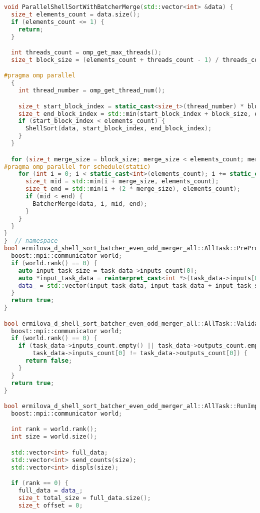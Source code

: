 \documentclass[a4paper,12pt]{article}
\begin{document}
\begin{lstlisting}[language=C++]
void ParallelShellSortWithBatcherMerge(std::vector<int> &data) {
  size_t elements_count = data.size();
  if (elements_count <= 1) {
    return;
  }

  int threads_count = omp_get_max_threads();
  size_t block_size = (elements_count + threads_count - 1) / threads_count;

#pragma omp parallel
  {
    int thread_number = omp_get_thread_num();

    size_t start_block_index = static_cast<size_t>(thread_number) * block_size;
    size_t end_block_index = std::min(start_block_index + block_size, elements_count) - 1;
    if (start_block_index < elements_count) {
      ShellSort(data, start_block_index, end_block_index);
    }
  }

  for (size_t merge_size = block_size; merge_size < elements_count; merge_size *= 2) {
#pragma omp parallel for schedule(static)
    for (int i = 0; i < static_cast<int>(elements_count); i += static_cast<int>(2 * merge_size)) {
      size_t mid = std::min(i + merge_size, elements_count);
      size_t end = std::min(i + (2 * merge_size), elements_count);
      if (mid < end) {
        BatcherMerge(data, i, mid, end);
      }
    }
  }
}
}  // namespace
bool ermilova_d_shell_sort_batcher_even_odd_merger_all::AllTask::PreProcessingImpl() {
  boost::mpi::communicator world;
  if (world.rank() == 0) {
    auto input_task_size = task_data->inputs_count[0];
    auto *input_task_data = reinterpret_cast<int *>(task_data->inputs[0]);
    data_ = std::vector(input_task_data, input_task_data + input_task_size);
  }
  return true;
}

bool ermilova_d_shell_sort_batcher_even_odd_merger_all::AllTask::ValidationImpl() {
  boost::mpi::communicator world;
  if (world.rank() == 0) {
    if (task_data->inputs_count.empty() || task_data->outputs_count.empty() || task_data->inputs_count[0] <= 0 ||
        task_data->inputs_count[0] != task_data->outputs_count[0]) {
      return false;
    }
  }
  return true;
}

bool ermilova_d_shell_sort_batcher_even_odd_merger_all::AllTask::RunImpl() {
  boost::mpi::communicator world;

  int rank = world.rank();
  int size = world.size();

  std::vector<int> full_data;
  std::vector<int> send_counts(size);
  std::vector<int> displs(size);

  if (rank == 0) {
    full_data = data_;
    size_t total_size = full_data.size();
    size_t offset = 0;


\end{lstlisting}
\end{document}
